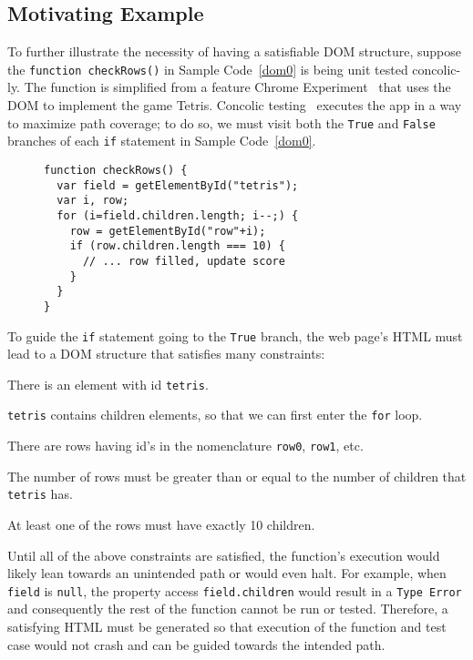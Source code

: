 \subsection{Motivating Example}
To further illustrate the necessity of having a satisfiable DOM structure, suppose the {\tt function checkRows()} in Sample Code~\ref{dom0} is being unit tested concolic-ly.  
The function is simplified from a feature Chrome Experiment~\cite{domtris} that uses the DOM to implement the game Tetris.  
Concolic testing~\cite{cute} executes the app in a way to maximize path coverage; to do so, we must visit both the {\tt True} and {\tt False} branches of each {\tt if} statement in Sample Code~\ref{dom0}.  
\begin{figure}
\begin{lstlisting}[caption=Example code whose tests and execution depend on the Document Object Model having a precise tree structure. {\tt getElementById()} is equivalent to {\tt document.getElementById()}.,label=dom0]
function checkRows() {
  var field = getElementById("tetris"); 
  var i, row;
  for (i=field.children.length; i--;) {
    row = getElementById("row"+i);
    if (row.children.length === 10) {
      // ... row filled, update score
    }
  }
}
\end{lstlisting}
\end{figure}

To guide the {\tt if} statement going to the {\tt True} branch, the web page's HTML must lead to a DOM structure that satisfies many constraints:
\begin {compactitem}
\item There is an element with id {\tt tetris}.
\item {\tt tetris} contains children elements, so that we can first enter the {\tt for} loop.
\item There are rows having id's in the nomenclature {\tt row0}, {\tt row1}, etc.
\item The number of rows must be greater than or equal to the number of children that {\tt tetris} has.
\item At least one of the rows must have exactly 10 children.
\end {compactitem}

Until all of the above constraints are satisfied, the function's execution would likely lean towards an unintended path or would even halt.   
For example, when {\tt field} is {\tt null}, the property access {\tt field.children} would result in a {\tt Type Error} and consequently the rest of the function cannot be run or tested.  
Therefore, a satisfying HTML must be generated so that execution of the function and test case would not crash and can be guided towards the intended path.  

